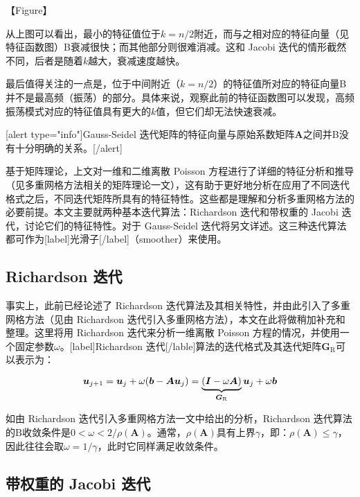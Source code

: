 \documentclass[12pt, UTF8, nofonts]{ctexart}
\begin{document}
【Figure】

从上图可以看出，最小的特征值位于$k=n/2$附近，而与之相对应的特征向量（见特征函数图）B衰减很快；而其他部分则很难消减。这和 Jacobi 迭代的情形截然不同，后者是随着$k$越大，衰减速度越快。

最后值得关注的一点是，位于中间附近（$k=n/2$）的特征值所对应的特征向量B并不是最高频（振荡）的部分。具体来说，观察此前的特征函数图可以发现，高频振荡模式对应的特征值具有更大的$k$值，但它们却无法快速衰减。

[alert type="info"]Gauss-Seidel 迭代矩阵的特征向量与原始系数矩阵$\boldsymbol{A}$之间并B没有十分明确的关系。[/alert]

\pagebreak

基于矩阵理论，上文对一维和二维离散 Poisson 方程进行了详细的特征分析和推导（见多重网格方法相关的矩阵理论一文），这有助于更好地分析在应用了不同迭代格式之后，不同迭代矩阵所具有的特征特性。这些都是理解和分析多重网格方法的必要前提。本文主要就两种基本迭代算法：Richardson 迭代和带权重的 Jacobi 迭代，讨论它们的特征特性。对于 Gauss-Seidel 迭代将另文详述。这三种迭代算法都可作为[label]光滑子[/label]（smoother）来使用。

\subsection*{Richardson 迭代}

事实上，此前已经论述了 Richardson 迭代算法及其相关特性，并由此引入了多重网格方法（见由 Richardson 迭代引入多重网格方法），本文在此将做稍加补充和整理。这里将用 Richardson 迭代来分析一维离散 Poisson 方程的情况，并使用一个固定参数$\omega$。[label]Richardson 迭代[/lable]算法的迭代格式及其迭代矩阵$\boldsymbol{G}_{\mathrm{R}}$可以表示为：

\begin{equation}
  \label{eq:richardson}
    \boldsymbol{u}_{j+1} = \boldsymbol{u}_j + \omega(\boldsymbol{b}-\boldsymbol{Au}_j) = \underbrace{(\boldsymbol{I} - \omega\boldsymbol{A})}_{\boldsymbol{G}_{\mathrm{R}}}\boldsymbol{u}_j + \omega\boldsymbol{b} \\
\end{equation}

如由 Richardson 迭代引入多重网格方法一文中给出的分析，Richardson 迭代算法的B收敛条件是$0<\omega<2/\rho(\boldsymbol{A})$。通常，$\rho(\boldsymbol{A})$具有上界$\gamma$，即：$\rho(\boldsymbol{A})\leq\gamma$，因此往往会取$\omega=1/\gamma$，此时它同样满足收敛条件。

\subsection*{带权重的 Jacobi 迭代}
\end{document}
